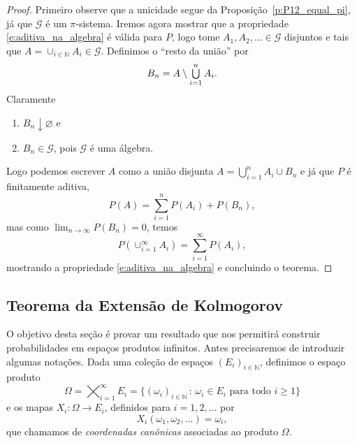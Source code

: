 \begin{proof}
  Primeiro observe que a unicidade segue da Proposição~\ref{p:P12_equal_pi}, já que $\mathcal{G}$ é um $\pi$-sistema.
  Iremos agora mostrar que a propriedade \eqref{e:aditiva_na_algebra} é válida para $P$, logo tome $A_1, A_2, \dots \in \mathcal{G}$ disjuntos e tais que $A = \cup_{i\in \mathbb{N}} A_i \in \mathcal{G}$.
  Definimos o ``resto da união'' por
  \begin{equation}
    B_n = A \setminus \operatorname*{{\textstyle \bigcup}}_{i=1}^n A_i.
  \end{equation}
  Claramente
  \begin{enumerate}[\quad a)]
  \item $B_n \downarrow \varnothing$ e
  \item $B_n \in \mathcal{G}$, pois $\mathcal{G}$ é uma álgebra.
  \end{enumerate}

  Logo podemos escrever $A$ como a união disjunta $A = \bigcup_{i=1}^n A_i \cup B_n$ e já que $P$ é finitamente aditiva,
  \begin{equation}
    P(A) = \sum_{i=1}^n P(A_i) + P(B_n),
  \end{equation}
  mas como $\lim_{n\to \infty} P(B_n) = 0$, temos
  \begin{equation}
    P(\cup_{i=1}^{\infty} A_i) = \sum_{i=1}^{\infty} P(A_i),
  \end{equation}
  mostrando a propriedade \eqref{e:aditiva_na_algebra} e concluindo o teorema.
\end{proof}

\subsection{Teorema da Extensão de Kolmogorov}

O objetivo desta seção é provar um resultado que nos permitirá construir probabilidades em espaços produtos infinitos.
Antes precisaremos de introduzir algumas notações.
Dada uma coleção de espaços $(E_i)_{i\in \mathbb{N}}$, definimos o espaço produto
\begin{equation}
  \Omega = \bigtimes_{i=1}^{\infty} E_i = \big\{(\omega_i)_{i\in \mathbb{N}} \, : \,  \omega_i \in E_i \text{ para todo $i \geq 1$}\big\}
\end{equation}
e os mapas $X_i:\Omega \to E_i$, definidos para $i = 1, 2, \dots$ por
\begin{equation}
  X_i(\omega_1, \omega_2, \dots) = \omega_i,
\end{equation}
que chamamos de \emph{coordenadas canônicas}  associadas ao produto $\Omega$.

